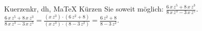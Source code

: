 \begin{MAufgabe}{Kuerzen}{kr, dh, MaTeX}
K\"urzen Sie soweit m\"oglich: $\frac{6\, x\, z^5 + 8\, x\, z^3}{8\, x\, z^3 - 3\, x\, z^5}$.\\ 
\ifLsg\MLoesung
\quad $\frac{6\, x\, z^5 + 8\, x\, z^3}{8\, x\, z^3 - 3\, x\, z^5}=\frac{(x\, z^3)\cdot(6\, z^2 + 8)}{(x\, z^3)\cdot(8 - 3\, z^2)}=\frac{6\, z^2 + 8}{8 - 3\, z^2}$.\else\relax\fi
 \end{MAufgabe}